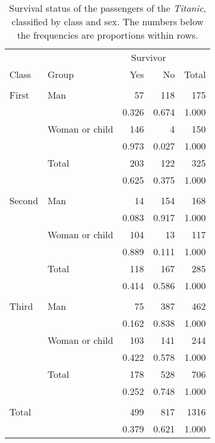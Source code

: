 \begin{table}
\caption{
Survival status of the passengers of the \emph{Titanic}, classified by
class and sex.
The numbers below the frequencies are proportions within rows.
}
\label{t_titanic3}
\begin{center}
\begin{tabular}{|l|l|rr|r|}\hline
& & \multicolumn{2}{|c|}{Survivor} & \\
Class & Group & Yes & No & Total \\
\hline
\multicolumn{5}{l}{}
\\ \hline
First & Man & 57 & 118 & 175 \\
&  & 0.326 & 0.674 & 1.000 \\
& Woman or child & 146 & 4 & 150 \\
&  & 0.973 & 0.027 & 1.000 \\ \hline
& Total & 203 & 122 & 325 \\
&  & 0.625 & 0.375 & 1.000 \\
\hline
\multicolumn{5}{l}{}
\\ \hline
Second & Man & 14 & 154 & 168 \\
&  & 0.083 & 0.917 & 1.000 \\
& Woman or child & 104 & 13 & 117 \\
&  & 0.889 & 0.111 & 1.000 \\ \hline
& Total & 118 & 167 & 285 \\
&  & 0.414 & 0.586 & 1.000 \\
\hline \multicolumn{5}{l}{}\\ \hline
Third & Man & 75 & 387 & 462 \\
&  & 0.162 & 0.838 & 1.000 \\
& Woman or child & 103 & 141 & 244 \\
&  & 0.422 & 0.578 & 1.000 \\ \hline
& Total & 178 & 528 & 706 \\
&  & 0.252 & 0.748 & 1.000 \\
\hline \multicolumn{5}{l}{}\\ \hline
Total & & 499 & 817 & 1316 \\
&  & 0.379 & 0.621 & 1.000 \\
\hline
\end{tabular}
\end{center}
\end{table}

